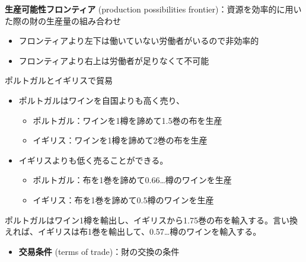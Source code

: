 \documentclass[
  xelatex,
  ja=standard]{bxjsarticle}
\providecommand{\tightlist}{%
  \setlength{\itemsep}{0pt}\setlength{\parskip}{0pt}}\usepackage{longtable,booktabs,array}
\begin{document}
\textbf{生産可能性フロンティア} (production possibilities
frontier)：資源を効率的に用いた際の財の生産量の組み合わせ

\begin{itemize}
\tightlist
\item
  フロンティアより左下は働いていない労働者がいるので非効率的
\item
  フロンティアより右上は労働者が足りなくて不可能
\end{itemize}

ポルトガルとイギリスで貿易

\begin{itemize}
\tightlist
\item
  ポルトガルはワインを自国よりも高く売り、

  \begin{itemize}
  \tightlist
  \item
    ポルトガル：ワインを1樽を諦めて1.5巻の布を生産
  \item
    イギリス：ワインを1樽を諦めて2巻の布を生産
  \end{itemize}
\item
  イギリスよりも低く売ることができる。

  \begin{itemize}
  \tightlist
  \item
    ポルトガル：布を1巻を諦めて0.66\ldots 樽のワインを生産
  \item
    イギリス：布を1巻を諦めて0.5樽のワインを生産
  \end{itemize}
\end{itemize}

\begin{tcolorbox}[enhanced jigsaw, toprule=.15mm, leftrule=.75mm, coltitle=black, opacityback=0, colback=white, title=\textcolor{quarto-callout-tip-color}{\faLightbulb}\hspace{0.5em}{イギリスとポルトガルの貿易'\,'}, rightrule=.15mm, bottomrule=.15mm, colbacktitle=quarto-callout-tip-color!10!white, opacitybacktitle=0.6, titlerule=0mm, colframe=quarto-callout-tip-color-frame, bottomtitle=1mm, toptitle=1mm, arc=.35mm, left=2mm, breakable]

ポルトガルはワイン1樽を輸出し、イギリスから1.75巻の布を輸入する。言い換えれば、イギリスは布1巻を輸出して、0.57\ldots 樽のワインを輸入する。

\end{tcolorbox}

\begin{itemize}
\tightlist
\item
  \textbf{交易条件} (terms of trade)：財の交換の条件
\end{itemize}
\end{document}
